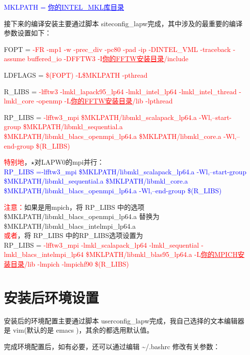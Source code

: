 \documentclass[10pt,a4paper]{article}
\begin{document}
\textcolor{blue}{MKLPATH = \underline{你的\textrm{INTEL\_MKL}库目录}}

接下来的编译安装主要通过脚本 \textrm{siteconfig\_lapw}完成，其中涉及的最重要的编译参数设置如下：

FOPT = \textcolor{red}{-FR -mp1 -w -prec\_div -pc80 -pad -ip -DINTEL\_VML -traceback -assume buffered\_io -DFFTW3 -I\underline{你的FFTW安装目录}/include}

LDFLAGS = \textcolor{red}{\$(FOPT) -L\${MKLPATH} -pthread}

R\_LIBS = \textcolor{red}{-lfftw3\; -lmkl\_lapack95\_lp64\; -lmkl\_intel\_lp64\; -lmkl\_intel\_thread\; -lmkl\_core\; -openmp\; -L\underline{你的FFTW安装目录}/lib\; -lpthread}

RP\_LIBS = \textcolor{red}{-lfftw3\_mpi\; \${MKLPATH}/libmkl\_scalapack\_lp64.a\; -Wl,--start-group\; \${MKLPATH}/libmkl\_sequential.a\; \${MKLPATH}/libmkl\_blacs\_openmpi\_lp64.a\; \${MKLPATH}/libmkl\_core.a\; -Wl,--end-group\/ \$(R\_LIBS)}

\textcolor{red}{特别地}，$\star$对\textrm{LAPW0}的\textrm{mpi}并行：\\
 \textcolor{blue}{RP\_LIBS =-lfftw3\_mpi\; \${MKLPATH}/libmkl\_scalapack\_lp64.a\; -Wl,--start-group\; \${MKLPATH}/libmkl\_sequential.a\; \${MKLPATH}/libmkl\_core.a\; \${MKLPATH}/libmkl\_blacs\_openmpi\_lp64.a\; -Wl,--end-group\/ \$(R\_LIBS)}

\textcolor{red}{注意：}如果是用mpich，将 \textrm{ RP\_LIBS } 中的选项\\
\${MKLPATH}/libmkl\_blacs\_openmpi\_lp64.a 替换为\\
\${MKLPATH}/libmkl\_blacs\_intelmpi\_lp64.a \\
\textcolor{red}{或者}，将 \textrm{ RP\_LIBS } 中的\textrm{RP\_LIBS}选项设置为\\
RP\_LIBS = \textcolor{red}{-lfftw3\_mpi\; -lmkl\_scalapack\_lp64\; -lmkl\_sequential\; -lmkl\_blacs\_intelmpi\_lp64\; \${MKLPATH}/libmkl\_blas95\_lp64.a\; -L\underline{你的MPICH安装目录}/lib\; -lmpich\; -lmpichf90\/ \$(R\_LIBS)}

\section{安装后环境设置}
安装后的环境配置主要通过脚本 \textrm{userconfig\_lapw}完成，我自己选择的文本编辑器是 \textrm{vim}(默认的是 \textrm{emacs} )，其余的都选用默认值。

完成环境配置后，如有必要，还可以通过编辑 \~\//.bashrc 修改有关参数：
\end{document}
